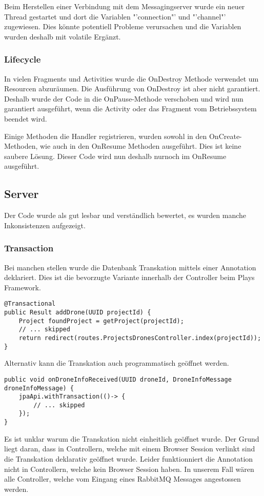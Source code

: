 Beim Herstellen einer Verbindung mit dem Messagingserver wurde ein neuer Thread gestartet und dort die Variablen "'connection"' und "'channel"' zugewiesen.
Dies könnte potentiell Probleme verursachen und die Variablen wurden deshalb mit volatile Ergänzt.

\subsubsection{Lifecycle}

In vielen Fragments und Activities wurde die OnDestroy Methode verwendet um Resourcen abzuräumen.
Die Ausführung von OnDestroy ist aber nicht garantiert.
Deshalb wurde der Code in die OnPause-Methode verschoben und wird nun garantiert ausgeführt, wenn die Activity oder das Fragment vom Betriebssystem beendet wird.

Einige Methoden die Handler registrieren, wurden sowohl in den OnCreate-Methoden, wie auch in den  OnResume Methoden ausgeführt.
 Dies ist keine saubere Lösung. Dieser Code wird nun deshalb nurnoch im OnResume ausgeführt.

\subsection{Server}

Der Code wurde als gut lesbar und verständlich bewertet, es wurden manche Inkonsistenzen aufgezeigt.

\subsubsection{Transaction}
Bei manchen stellen wurde die Datenbank Transkation mittels einer Annotation deklariert.
Dies ist die bevorzugte Variante innerhalb der Controller beim Plays Framework.
\begin{lstlisting}
@Transactional
public Result addDrone(UUID projectId) {
    Project foundProject = getProject(projectId);
    // ... skipped
    return redirect(routes.ProjectsDronesController.index(projectId));
}
\end{lstlisting}
Alternativ kann die Transkation auch programmatisch geöffnet werden.
\begin{lstlisting}
public void onDroneInfoReceived(UUID droneId, DroneInfoMessage droneInfoMessage) {
    jpaApi.withTransaction(()-> {
        // ... skipped
    });
}
\end{lstlisting}
Es ist unklar warum die Transkation nicht einheitlich geöffnet wurde.
Der Grund liegt daran, dass in Controllern, welche mit einem Browser Session verlinkt sind die Transkation deklarativ geöffnet wurde.
Leider funktionniert die Annotation nicht in Controllern, welche kein Browser Session haben.
In unserem Fall wären alle Controller, welche vom Eingang eines RabbitMQ Messages angestossen werden.

